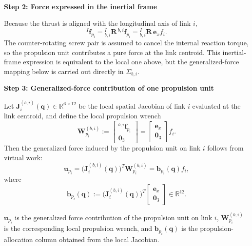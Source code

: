 \documentclass[12pt,a4paper]{report}
\newcommand{\newsymbols}[1]{\par\noindent{}#1\par\vspace{0.35em}}
\newcommand{\Frame}[1]{\Sigma_{#1}}
\begin{document}
\textbf{Step 2: Force expressed in the inertial frame}

Because the thrust is aligned with the longitudinal axis of link $i$,
\begin{equation}
{}^{I}\mathbf{f}_{p_i}
= {}_{b,i}^{I}\mathbf{R}\,{}^{b,i}\mathbf{f}_{p_i}
= {}_{b,i}^{I}\mathbf{R}\,\mathbf{e}_x f_i.
\end{equation}
The counter-rotating screw pair is assumed to cancel the internal reaction torque, so the propulsion unit contributes a pure force at the link centroid. This inertial-frame expression is equivalent to the local one above, but the generalized-force mapping below is carried out directly in $\Frame{b,i}$.

\textbf{Step 3: Generalized-force contribution of one propulsion unit}

Let $\mathbf{J}_i^{(b,i)}(\mathbf{q}) \in \mathbb{R}^{6\times12}$ be the local spatial Jacobian of link $i$ evaluated at the link centroid, and define the local propulsion wrench
\begin{equation}
\mathbf{W}_{p_i}^{(b,i)}
:=
\begin{bmatrix}
{}^{b,i}\mathbf{f}_{p_i} \\
\mathbf{0}_3
\end{bmatrix}
=
\begin{bmatrix}
\mathbf{e}_x \\
\mathbf{0}_3
\end{bmatrix}
f_i.
\end{equation}
Then the generalized force induced by the propulsion unit on link $i$ follows from virtual work:
\begin{equation}
\mathbf{u}_{p_i}
= \bigl(\mathbf{J}_i^{(b,i)}(\mathbf{q})\bigr)^T \mathbf{W}_{p_i}^{(b,i)}
= \mathbf{b}_{p_i}(\mathbf{q}) f_i,
\end{equation}
where
\begin{equation}
\mathbf{b}_{p_i}(\mathbf{q})
:=
\bigl(\mathbf{J}_i^{(b,i)}(\mathbf{q})\bigr)^T
\begin{bmatrix}
\mathbf{e}_x \\
\mathbf{0}_3
\end{bmatrix}
\in \mathbb{R}^{12}.
\end{equation}
\newsymbols{$\mathbf{u}_{p_i}$ is the generalized force contribution of the propulsion unit on link $i$, $\mathbf{W}_{p_i}^{(b,i)}$ is the corresponding local propulsion wrench, and $\mathbf{b}_{p_i}(\mathbf{q})$ is the propulsion-allocation column obtained from the local Jacobian.}
\end{document}
